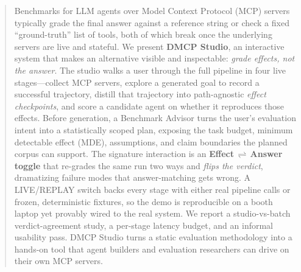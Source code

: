 \begin{abstract}
Benchmarks for LLM agents over Model Context Protocol (MCP) servers
typically grade the final answer against a reference string or check a
fixed ``ground-truth'' list of tools, both of which break once the
underlying servers are live and stateful. We present \textbf{DMCP
Studio}, an interactive system that makes an alternative visible and
inspectable: \emph{grade effects, not the answer}. The studio walks a user
through the full pipeline in four live stages---collect MCP servers, explore a
generated goal to record a successful trajectory, distill that trajectory into
path-agnostic \emph{effect checkpoints}, and score a candidate agent on whether
it reproduces those effects. Before generation, a Benchmark Advisor turns the
user's evaluation intent into a statistically scoped plan, exposing the task
budget, minimum detectable effect (MDE), assumptions, and claim boundaries the
planned corpus can support. The signature interaction is an
\textbf{Effect\,$\rightleftharpoons$\,Answer toggle} that re-grades the same
run two ways and \emph{flips the verdict}, dramatizing failure modes that
answer-matching gets wrong. A LIVE/REPLAY switch backs every stage with either
real pipeline calls or frozen, deterministic fixtures, so the demo is
reproducible on a booth laptop yet provably wired to the real system. We report
a studio-vs-batch verdict-agreement study, a per-stage latency budget, and an
informal usability pass. DMCP Studio turns a static evaluation methodology into
a hands-on tool that agent builders and evaluation researchers can drive on
their own MCP servers.
\end{abstract}

